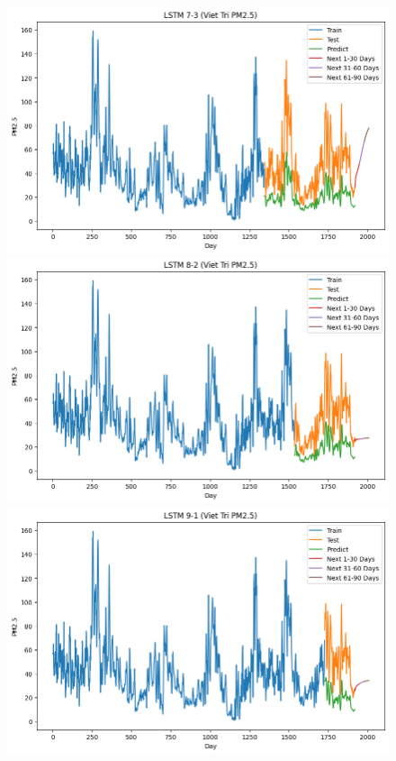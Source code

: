 \begin{figure}[H]
{\begin{adjustbox}{minipage=0.48\textwidth}
\begin{minipage}{0.3\textwidth}
            \end{minipage}\hfill
            \begin{minipage}{0.3\textwidth}
                \centering
                \includegraphics[width=\textwidth, height=0.6\textwidth]{img/final/LSTM/90D/LSTM_7_3_VT.png}\\
                \includegraphics[width=\textwidth, height=0.6\textwidth]{img/final/LSTM/90D/LSTM_8_2_VT.png}\\
                \includegraphics[width=\textwidth, height=0.6\textwidth]{img/final/LSTM/90D/LSTM_9_1_VT.png}

\end{minipage}
\end{adjustbox}}
\end{figure}
